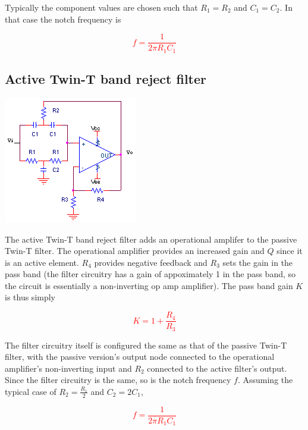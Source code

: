Typically the component values are chosen such that $R_{1} = R_{2}$ and $C_{1} = C_{2}$. In that case the notch frequency \autocite[324]{op-amps-for-everyone} is

\textcolor{red}{
\begin{equation}
f = \frac{1}{2\pi R_{1}C_{1}}
\label{eq:passiveWienRobinson}
\end{equation}
}

\subsection{Active Twin-T band reject filter}
\begin{center}
	\includegraphics{schematics/activeTwinTbandrejectfilter.PNG}
\end{center}
The active Twin-T band reject filter adds an operational amplifer to the passive Twin-T filter. The operational amplifier provides an increased gain and $Q$ since it is an active element. $R_{4}$ provides negative feedback and $R_{3}$ sets the gain in the pass band (the filter circuitry has a gain of appoximately 1 in the pass band, so the circuit is essentially a non-inverting op amp amplifier). The pass band gain $K$ is thus simply

\textcolor{red}{
\begin{equation}
K = 1 + \frac{R_{4}}{R_{3}}
\end{equation}
}

The filter circuitry itself is configured the same as that of the passive Twin-T filter, with the passive version's output node connected to the operational amplifier's non-inverting input and $R_{2}$ connected to the active filter's output. Since the filter circuitry is the same, so is the notch frequency $f$. Assuming the typical case of $R_{2} = \frac{R_{1}}{2}$ and $C_{2} = 2C_{1}$,

\textcolor{red}{
\begin{equation}
f = \frac{1}{2\pi R_{1}C_{1}}
\end{equation}
}

